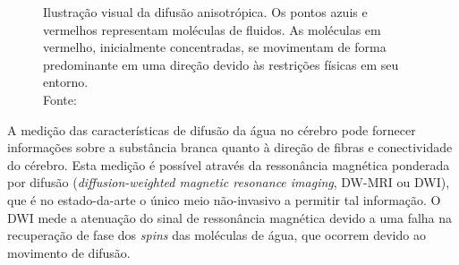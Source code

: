\documentclass[
    12pt,                %
    oneside,            %
    a4paper,            %
    english,            %
    french,                %
    spanish,            %
    brazil                %
    ]{abntex2}
\begin{document}
\begin{figure}[ht]
\centering
\captionsetup[subfloat]{farskip=0pt,nearskip=0pt}
    \caption{Ilustração visual da difusão anisotrópica. Os pontos azuis e vermelhos representam moléculas de fluidos. As moléculas em vermelho, inicialmente concentradas, se movimentam de forma predominante em uma direção devido às restrições físicas em seu entorno. \\ Fonte: \cite{voltoline2016}
    }
    \label{fig::intro_difusao_anisotropica}
\end{figure}



A medição das características de difusão da água no cérebro pode fornecer informações sobre a substância branca quanto à direção de fibras e conectividade do cérebro. Esta medição é possível através da ressonância magnética ponderada por difusão (\textit{diffusion-weighted magnetic resonance imaging}, DW-MRI ou DWI), que é no estado-da-arte o único meio não-invasivo a permitir tal informação. O DWI mede a atenuação do sinal de ressonância magnética devido a uma falha na recuperação de fase dos \textit{spins} das moléculas de água, que ocorrem devido ao movimento de difusão.
\end{document}
